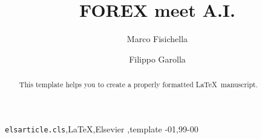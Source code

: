 \documentclass[1p]{elsarticle}
\begin{document}
\begin{frontmatter}

\title{FOREX meet A.I.}


\author[l3s_address]{Marco Fisichella}

\author[filippoaddress]{Filippo Garolla}


\address[l3saddress]{L3S Research Center of Leibniz University of Hannover, Germany}
\address[filippoaddress]{SLR Engineering, Graz, Austria}

\begin{abstract}
This template helps you to create a properly formatted \LaTeX\ manuscript.
\end{abstract}

\begin{keyword}
\texttt{elsarticle.cls}\sep \LaTeX\sep Elsevier \sep template
-01\sep  99-00
\end{keyword}

\end{frontmatter}
















\end{document}
